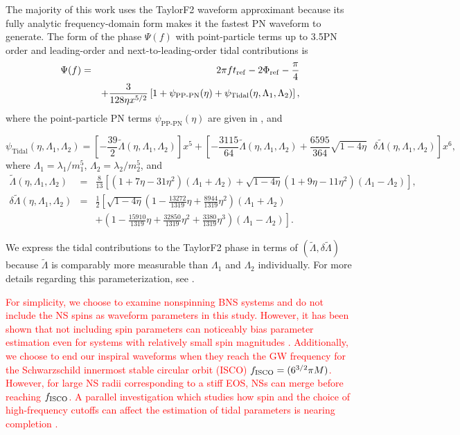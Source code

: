 \documentclass[twocolumn,prd,amssymb,aps,nofootinbib,showpacs,epsf]{revtex4}
\newcommand\ben[2]{\textcolor{red}{{#1}\sout{#2}}}
\begin{document}
The majority of this work uses the TaylorF2 waveform approximant because its fully analytic frequency-domain form makes it the fastest PN waveform to generate.  The form of the phase $\Psi(f)$ with point-particle terms up to 3.5PN order and leading-order and next-to-leading-order tidal contributions is
\begin{eqnarray}
\Psi(f)&=&2\pi f t_{\rm ref} - 2\Phi_{\rm ref} -\frac{\pi}{4}\\
\nonumber
&&+\frac{3}{128\eta x^{5/2}}\left[1+\psi_\text{PP-PN}(\eta)+\psi_\text{Tidal}(\eta,\Lambda_1,\Lambda_2)\right],
\end{eqnarray}
where the point-particle PN terms $\psi_\text{PP-PN}(\eta)$ are given in \cite{BuonannoIyerOchsner2009}, and
\begin{widetext}
\begin{equation}
\label{eq:psi_tidal}
\psi_\text{Tidal}(\eta,\Lambda_1,\Lambda_2)=\left[-\frac{39}{2}\tilde{\Lambda}(\eta,\Lambda_1,\Lambda_2)\right]x^5+ \left[-\frac{3115}{64}\tilde{\Lambda}(\eta,\Lambda_1,\Lambda_2)+\frac{6595}{364}\sqrt{1-4\eta}\mbox{ }\delta\tilde{\Lambda}(\eta,\Lambda_1,\Lambda_2)\right]x^6,
\end{equation}
where $\Lambda_1=\lambda_1/m_1^5$, $\Lambda_2=\lambda_2/m_2^5$, and
\begin{eqnarray}
\label{eq:LT}
\tilde{\Lambda}(\eta,\Lambda_1,\Lambda_2)&=&\frac{8}{13}\left[\left(1+7\eta-31\eta^2\right)\left(\Lambda_1+\Lambda_2\right)+\sqrt{1-4\eta}\left(1+9\eta-11\eta^2\right)\left(\Lambda_1-\Lambda_2\right)\right],\\
\label{eq:dLT}
\delta\tilde{\Lambda}(\eta,\Lambda_1,\Lambda_2)&=&\frac{1}{2}\left[\sqrt{1-4\eta}\left(1-\frac{13272}{1319}\eta+\frac{8944}{1319}\eta^2\right)\left(\Lambda_1+\Lambda_2\right) \right .\\
&& + \left . \left(1-\frac{15910}{1319}\eta+\frac{32850}{1319}\eta^2+\frac{3380}{1319}\eta^3\right)\left(\Lambda_1-\Lambda_2\right)\right].
\end{eqnarray}
\end{widetext}
We express the tidal contributions to the TaylorF2 phase in terms of $(\tilde\Lambda,\delta\tilde\Lambda)$ because $\tilde\Lambda$ is comparably more measurable than $\Lambda_1$ and $\Lambda_2$ individually.  For more details regarding this parameterization, see \cite{WadeCreightonOchsner2014,Favata2014}.

\ben{For simplicity, we choose to examine nonspinning BNS systems and do not include the NS spins as waveform parameters in this study.  However, it has been shown that not including spin parameters can noticeably bias parameter estimation even for systems with relatively small spin magnitudes \cite{Favata2014}.  Additionally, we choose to end our inspiral waveforms when they reach the GW frequency for the Schwarzschild innermost stable circular orbit (ISCO) $f_{\rm ISCO}=(6^{3/2}\pi M)$.  However, for large NS radii corresponding to a stiff EOS, NSs can merge before reaching $f_{\rm ISCO}$.  A parallel investigation which studies how spin and the choice of high-frequency cutoffs can affect the estimation of tidal parameters is nearing completion \cite{Nikhef_paper_2}.}{}
\end{document}
